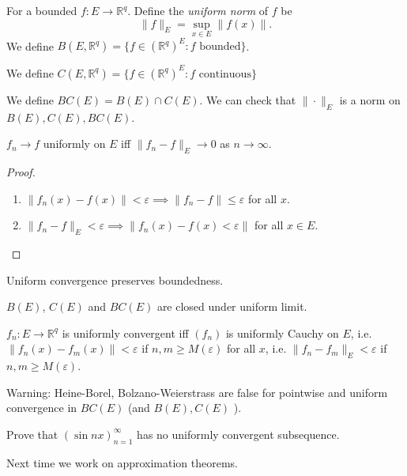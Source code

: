 \begin{definition}
	For a bounded $f: E \to \mathbb{R}^q$. Define the \textit{uniform norm} of $f$ be
	\[
		\|f\|_E = \operatorname{sup}_{x \in E} \|f(x)\|
	.\] 
	We define $B(E, \mathbb{R}^q) = \{f \in \left( \mathbb{R}^q \right) ^{E}: f \text{ bounded}\} $.

	We define $C(E, \mathbb{R}^q) = \{f \in \left( \mathbb{R}^q \right) ^{E}: f \text{ continuous}\}$ 

	We define $BC(E) = B(E) \cap C(E)$. We can check that $\|\cdot\|_E$ is a norm on $B(E), C(E), BC(E)$.
\end{definition}

\begin{proposition}
	$f_n \to f$ uniformly on $E$ iff $\|f_n - f\|_E \to 0$ as $n\to \infty $.
\end{proposition}
\begin{proof}
	\begin{enumerate}
		\item [$\implies$ :] $\|f_n(x) - f(x)\|< \varepsilon \implies \|f_n - f\|\le \varepsilon$ for all $x$.
		\item [$\impliedby$ : ] $\|f_n - f\|_E < \varepsilon \implies \|f_n(x) - f(x) < \varepsilon\|$ for all $x \in E$.
	\end{enumerate}
\end{proof}
	
\begin{corollary}
	Uniform convergence preserves boundedness.
\end{corollary}

\begin{corollary}
	$B(E)$,  $C(E)$ and $BC(E)$ are closed under uniform limit.
\end{corollary}

\begin{proposition}
	$f_n: E \to \mathbb{R}^q$ is uniformly convergent iff $(f_n)$ is uniformly Cauchy on $E$, i.e. $\|f_n(x) - f_m(x)\|<\varepsilon$ if $n, m \ge M(\varepsilon)$ for all $x$, i.e. $\|f_n - f_m\|_E < \varepsilon$ if $n, m \ge M(\varepsilon)$.
\end{proposition}

\begin{remark}
	Warning: Heine-Borel, Bolzano-Weierstrass are false for pointwise and uniform convergence in $BC(E)$ (and $B(E), C(E)$ ).
\end{remark}
\begin{example}
	Prove that $\left( \sin n x \right)_{n=1}^{\infty }$ has no uniformly convergent subsequence.
\end{example}

Next time we work on approximation theorems.
